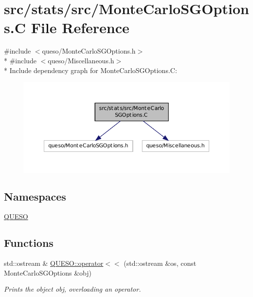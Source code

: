\hypertarget{_monte_carlo_s_g_options_8_c}{\section{src/stats/src/\-Monte\-Carlo\-S\-G\-Options.C File Reference}
\label{_monte_carlo_s_g_options_8_c}
}
{\ttfamily \#include $<$queso/\-Monte\-Carlo\-S\-G\-Options.\-h$>$}\\*
{\ttfamily \#include $<$queso/\-Miscellaneous.\-h$>$}\\*
Include dependency graph for Monte\-Carlo\-S\-G\-Options.\-C\-:
\nopagebreak
\begin{figure}[H]
\begin{center}
\leavevmode
\includegraphics[width=350pt]{_monte_carlo_s_g_options_8_c__incl}
\end{center}
\end{figure}
\subsection*{Namespaces}
\begin{DoxyCompactItemize}
\item 
\hyperlink{namespace_q_u_e_s_o}{Q\-U\-E\-S\-O}
\end{DoxyCompactItemize}
\subsection*{Functions}
\begin{DoxyCompactItemize}
\item 
std\-::ostream \& \hyperlink{namespace_q_u_e_s_o_a1e37d289bad8dc2aa2600ea78d1a6d9f}{Q\-U\-E\-S\-O\-::operator$<$$<$} (std\-::ostream \&os, const Monte\-Carlo\-S\-G\-Options \&obj)
\begin{DoxyCompactList}\small\item\em Prints the object {\ttfamily obj}, overloading an operator. \end{DoxyCompactList}\end{DoxyCompactItemize}
